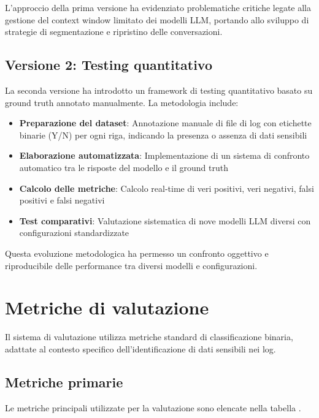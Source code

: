 \documentclass[12pt]{report}
\begin{document}
L'approccio della prima versione ha evidenziato problematiche critiche legate alla gestione del context window limitato dei modelli LLM, portando allo sviluppo di strategie di segmentazione e ripristino delle conversazioni.

\subsection{Versione 2: Testing quantitativo}
\label{subsec:metodologia_v2}

La seconda versione ha introdotto un framework di testing quantitativo basato su ground truth annotato manualmente. La metodologia include:

\begin{itemize}
    \item \textbf{Preparazione del dataset}: Annotazione manuale di file di log con etichette binarie (Y/N) per ogni riga, indicando la presenza o assenza di dati sensibili
    \item \textbf{Elaborazione automatizzata}: Implementazione di un sistema di confronto automatico tra le risposte del modello e il ground truth
    \item \textbf{Calcolo delle metriche}: Calcolo real-time di veri positivi, veri negativi, falsi positivi e falsi negativi
    \item \textbf{Test comparativi}: Valutazione sistematica di nove modelli LLM diversi con configurazioni standardizzate
\end{itemize}

Questa evoluzione metodologica ha permesso un confronto oggettivo e riproducibile delle performance tra diversi modelli e configurazioni.

\section{Metriche di valutazione}
\label{sec:metriche_test}

Il sistema di valutazione utilizza metriche standard di classificazione binaria, adattate al contesto specifico dell'identificazione di dati sensibili nei log.

\subsection{Metriche primarie}
\label{subsec:metriche_primarie}

Le metriche principali utilizzate per la valutazione sono elencate nella tabella .
\end{document}
